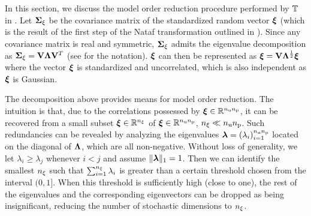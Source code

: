 In this section, we discuss the model order reduction procedure performed by $\transformation$ in .
Let $\mCov_\z$ be the covariance matrix of the standardized random vector $\vz$ (which is the result of the first step of the Nataf transformation outlined in ).
Since any covariance matrix is real and symmetric, $\mCov_\z$ admits the eigenvalue decomposition as $\mCov_\z = \mV \mL \mV^T$ (see  for the notation).
$\vz$ can then be represented as $\vz = \mV \mL^\frac{1}{2} \vz$ where the vector $\vz$ is standardized and uncorrelated, which is also independent as $\vz$ is Gaussian.

The decomposition above provides means for model order reduction.
The intuition is that, due to the correlations possessed by $\vz \in \real^{\nparams \nprocs}$, it can be recovered from a small subset $\vz \in \real^\nvars$ of $\vz\in \real^{\nparams \nprocs}$, $\nvars \ll \nparams \nprocs$.
Such redundancies can be revealed by analyzing the eigenvalues $\dimensionContribution = (\lambda_i)_{i = 1}^{\nparams \nprocs}$ located on the diagonal of $\mL$, which are all non-negative.
Without loss of generality, we let $\lambda_i \geq \lambda_j$ whenever $i < j$ and assume $\norm[1]{\dimensionContribution} = 1$.
Then we can identify the smallest $\nvars$ such that $\sum_{i = 1}^\nvars \lambda_i$ is greater than a certain threshold chosen from the interval $(0, 1]$.
When this threshold is sufficiently high (close to one), the rest of the eigenvalues and the corresponding eigenvectors can be dropped as being insignificant, reducing the number of stochastic dimensions to $\nvars$.
